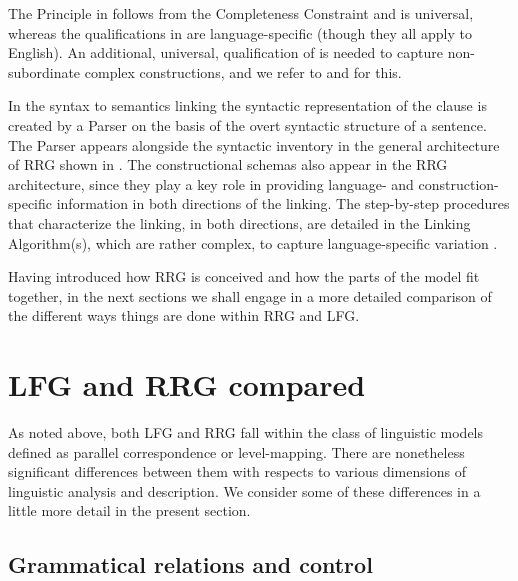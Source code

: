 \documentclass[output=paper,hidelinks]{langscibook}
\begin{document}
The Principle in  follows from the Completeness Constraint and is universal, whereas the qualifications in  are language-specific (though they all apply to English). An additional, universal, qualification of  is needed to capture non-subordinate complex constructions, and we refer to \citet[546]{VanValin1997} and \citet{Paris2022} for this.

  In the syntax to semantics linking the syntactic representation of the clause is created by a Parser on the basis of the overt syntactic structure of a sentence. The Parser appears alongside the syntactic inventory in the general architecture of RRG shown in  \citep[131]{VanValin2005}. The constructional schemas also appear in the RRG architecture, since they play a key role in providing language- and construction-specific information in both directions of the linking. The step-by-step procedures that characterize the linking, in both directions, are detailed in the Linking Algorithm(s), which are rather complex, to capture language-specific variation \citep[136-158]{VanValin2005}.

  Having introduced how RRG is conceived and how the parts of the model fit together, in the next sections we shall engage in a more detailed comparison of the different ways things are done within RRG and LFG.

\section{LFG and RRG compared}
\label{sec:RRG:3}

As noted above, both LFG and RRG fall within the class of linguistic models defined as parallel correspondence or level-mapping. There are nonetheless significant differences between them with respects to various dimensions of linguistic analysis and description. We consider some of these differences in a little more detail in the present section.

\subsection{Grammatical relations and control}
\label{sec:RRG:3.1}
\end{document}
